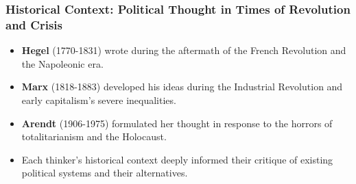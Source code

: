\documentclass{beamer}
\begin{document}
\begin{frame}
\frametitle{Historical Context: Political Thought in Times of Revolution and Crisis}
\begin{itemize}
    \item \textbf{Hegel} (1770-1831) wrote during the aftermath of the French Revolution and the Napoleonic era.
    \item \textbf{Marx} (1818-1883) developed his ideas during the Industrial Revolution and early capitalism's severe inequalities.
    \item \textbf{Arendt} (1906-1975) formulated her thought in response to the horrors of totalitarianism and the Holocaust.
    \item Each thinker's historical context deeply informed their critique of existing political systems and their alternatives.
\end{itemize}

\begin{center}
\end{center}
\end{frame}
\end{document}
